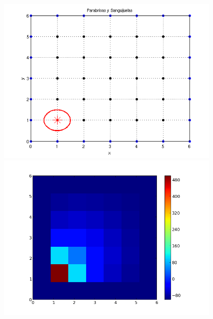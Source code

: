 \begin{figure}[htb]
\begin{center}
\includegraphics[scale=0.40]{imagenes/matrizbandaej_instancia.png} 
\includegraphics[scale=0.40]{imagenes/matrizbandaej_temp.png} 
\end{center}
\end{figure}

